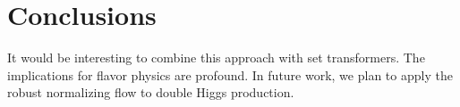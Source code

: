 \section{Conclusions}\label{sec:conclusions}

It would be interesting to combine this approach with set transformers.
The implications for flavor physics are profound. In future work, we
plan to apply the robust normalizing flow to double Higgs production.

